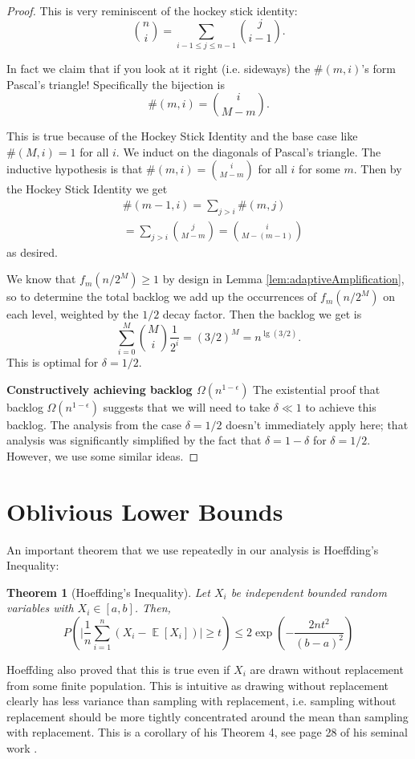 \documentclass[twocolumn]{article}[11pt]
\DeclareMathOperator{\E}{\mathbb{E}}
\newtheorem{theorem}{Theorem}
\begin{document}
\begin{proof}
  This is very reminiscent of the hockey stick identity:
  $${n \choose i} = \sum_{i-1\le j\le n-1} {j \choose i-1}.$$

  In fact we claim that if you look at it right (i.e. sideways) the $\#(m,
  i)$'s form Pascal's triangle!
  Specifically the bijection is 
  $$\#(m,i) = {i \choose M-m}.$$

  This is true because of the Hockey Stick Identity and the base case
  like $\#(M, i)=1$ for all $i$. We induct on the diagonals of Pascal's
  triangle. The inductive hypothesis is that $\#(m, i) = {i \choose M-m}$ for
  all $i$ for some $m$. Then by the Hockey Stick Identity we get 
  \begin{align*}
  &\#(m-1, i) = \sum_{j>i} \#(m,j) \\
  &= \sum_{j>i} {j \choose M-m} = {i \choose M-(m-1)}
  \end{align*}
  as desired.

  We know that $f_m(n/2^M) \ge 1$ by design in Lemma
  \ref{lem:adaptiveAmplification}, so to determine the total backlog we add up
  the occurrences of $f_m(n/2^M)$ on each level, weighted by the
  $1/2$ decay factor. Then the backlog we get is $$\sum_{i=0}^M {M \choose
  i}\frac{1}{2^i} = (3/2)^{M} = n^{\lg(3/2)}.$$
  This is optimal for $\delta= 1/2$.

  \textbf{Constructively achieving backlog $\Omega(n^{1-\epsilon})$}
  The existential proof that backlog $\Omega(n^{1-\epsilon})$ suggests that we
  will need to take $\delta \ll 1$ to achieve this backlog. The analysis from
  the case $\delta = 1/2$ doesn't immediately apply here; that analysis was
  significantly simplified by the fact that $\delta = 1-\delta$ for $\delta =
  1/2$. However, we use some similar ideas.


\end{proof}

\section{Oblivious Lower Bounds}\label{sec:oblivious}

An important theorem that we use repeatedly in our analysis is Hoeffding's Inequality:
\begin{theorem}[Hoeffding's Inequality]
  Let $X_i$ be independent bounded random variables with $X_i \in [a,b]$. Then,
  $$P\left(\Big|\frac{1}{n} \sum_{i=1}^n (X_i - \E[X_i])\Big|\ge t\right) \le
  2\exp\left(-\frac{2nt^2}{(b-a)^2}\right) $$
\end{theorem}
Hoeffding also proved that this is true even if $X_i$ are drawn without
replacement from some finite population. This is intuitive as drawing without
replacement clearly has less variance than sampling with replacement, i.e.
sampling without replacement should be more tightly concentrated around the
mean than sampling with replacement. This is a corollary of his Theorem 4, see
page 28 of his seminal work \cite{who62}.
\end{document}
